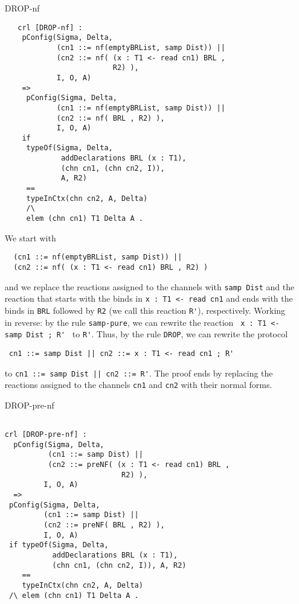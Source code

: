 \documentclass{article}
\begin{document}
\begin{itemize}
\item[DROP-nf]
 \begin{lstlisting}
   crl [DROP-nf] :
    pConfig(Sigma, Delta,
            (cn1 ::= nf(emptyBRList, samp Dist)) || 
            (cn2 ::= nf( (x : T1 <- read cn1) BRL , 
                         R2) ),
            I, O, A) 
    =>           
     pConfig(Sigma, Delta,
            (cn1 ::= nf(emptyBRList, samp Dist)) || 
            (cn2 ::= nf( BRL , R2) ),
            I, O, A) 
    if 
     typeOf(Sigma, Delta, 
             addDeclarations BRL (x : T1), 
             (chn cn1, (chn cn2, I)), 
             A, R2) 
     == 
     typeInCtx(chn cn2, A, Delta)
     /\
     elem (chn cn1) T1 Delta A .  
       \end{lstlisting}

 We start with 
 \begin{lstlisting}
  (cn1 ::= nf(emptyBRList, samp Dist)) || 
  (cn2 ::= nf( (x : T1 <- read cn1) BRL , R2) )
 \end{lstlisting} 
 \noindent and we replace the reactions assigned to the 
 channels with \verb+samp Dist+ and the reaction that starts
 with the binds in \verb+x : T1 <- read cn1+ and ends with 
 the binds in \verb+BRL+ followed by \verb+R2+ (we call this reaction
 \verb+R'+), respectively.
 Working in reverse: by the rule \verb+samp-pure+,
 we can rewrite the reaction \verb+ x : T1 <- samp Dist ; R' +  
 to \verb+R'+. Thus, by the rule \verb+DROP+, we can rewrite the 
 protocol 
 \begin{lstlisting}
 cn1 ::= samp Dist || cn2 ::= x : T1 <- read cn1 ; R'
 \end{lstlisting}
 to \verb+cn1 ::= samp Dist || cn2 ::= R'+. The proof ends by replacing
 the reactions assigned to the channels \verb+cn1+ and \verb+cn2+ with 
 their normal forms.
 
 
\item[DROP-pre-nf]
 \begin{lstlisting} 
                   
crl [DROP-pre-nf] :
  pConfig(Sigma, Delta,
          (cn1 ::= samp Dist) || 
          (cn2 ::= preNF( (x : T1 <- read cn1) BRL , 
                           R2) ),
         I, O, A) 
  =>           
 pConfig(Sigma, Delta,
         (cn1 ::= samp Dist) || 
         (cn2 ::= preNF( BRL , R2) ),
         I, O, A) 
 if typeOf(Sigma, Delta, 
           addDeclarations BRL (x : T1), 
           (chn cn1, (chn cn2, I)), A, R2) 
    == 
    typeInCtx(chn cn2, A, Delta)
 /\ elem (chn cn1) T1 Delta A .   
       \end{lstlisting}
       

\end{itemize}
\end{document}
